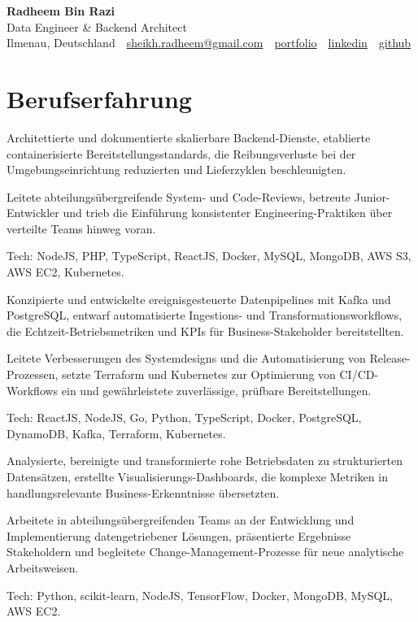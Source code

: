\documentclass[11pt,a4paper]{resume}
\makeatletter
\newcommand{\Portfolio}{https://radheem.github.io/my-cv}
\newcommand{\PortfolioText}{portfolio}
\newcommand{\GitHub}{https://github.com/radheem}
\newcommand{\LinkedIn}{https://www.linkedin.com/in/radheem-razi}
\newcommand{\Email}{sheikh.radheem@gmail.com}
\makeatother
\begin{document}
\clearpage
{}

\begin{center}
  {\huge\bfseries Radheem Bin Razi}\\[3pt]
  {\large Data Engineer \& Backend Architect}\\[6pt]
  \small
  Ilmenau, Deutschland \,\textbar\,
  \href{mailto:\Email}{\Email} \,\textbar\,
  \href{\Portfolio}{\PortfolioText} \,\textbar\,
  \href{\LinkedIn}{linkedin} \,\textbar\,
  \href{\GitHub}{github}
\end{center}
\vspace{2pt}

\section{Berufserfahrung}

\bullets
  \item Architettierte und dokumentierte skalierbare Backend-Dienste, etablierte containerisierte Bereitstellungsstandards, die Reibungsverluste bei der Umgebungseinrichtung reduzierten und Lieferzyklen beschleunigten.
  \item Leitete abteilungsübergreifende System- und Code-Reviews, betreute Junior-Entwickler und trieb die Einführung konsistenter Engineering-Praktiken über verteilte Teams hinweg voran.
  \item Tech: NodeJS, PHP, TypeScript, ReactJS, Docker, MySQL, MongoDB, AWS S3, AWS EC2, Kubernetes.
\bulletsend
\vspace{3pt}
\bullets
  \item Konzipierte und entwickelte ereignisgesteuerte Datenpipelines mit Kafka und PostgreSQL, entwarf automatisierte Ingestions- und Transformationsworkflows, die Echtzeit-Betriebsmetriken und KPIs für Business-Stakeholder bereitstellten.
  \item Leitete Verbesserungen des Systemdesigns und die Automatisierung von Release-Prozessen, setzte Terraform und Kubernetes zur Optimierung von CI/CD-Workflows ein und gewährleistete zuverlässige, prüfbare Bereitstellungen.
  \item Tech: ReactJS, NodeJS, Go, Python, TypeScript, Docker, PostgreSQL, DynamoDB, Kafka, Terraform, Kubernetes.
\bulletsend
\vspace{3pt}
\bullets
  \item Analysierte, bereinigte und transformierte rohe Betriebsdaten zu strukturierten Datensätzen, erstellte Visualisierungs-Dashboards, die komplexe Metriken in handlungsrelevante Business-Erkenntnisse übersetzten.
  \item Arbeitete in abteilungsübergreifenden Teams an der Entwicklung und Implementierung datengetriebener Lösungen, präsentierte Ergebnisse Stakeholdern und begleitete Change-Management-Prozesse für neue analytische Arbeitsweisen.
  \item Tech: Python, scikit-learn, NodeJS, TensorFlow, Docker, MongoDB, MySQL, AWS EC2.
\bulletsend
\vspace{3pt}
\end{document}
